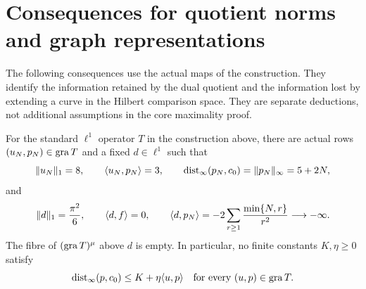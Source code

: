 \section{Consequences for quotient norms and graph representations}
The following consequences use the actual maps of the construction. They
identify the information retained by the dual quotient and the information
lost by extending a curve in the Hilbert comparison space. They are separate deductions,
not additional assumptions in the core maximality proof.

\begin{corollary}\label{cor:corona}
For the standard $\ell^1$ operator $T$ in the construction above, there are
actual rows $(u_N,p_N)\in\operatorname{gra} T$ and a fixed $d\in\ell^1$ such that
\begin{equation}
\|u_N\|_1=8,\qquad \langle u_N,p_N\rangle=3,\qquad
\operatorname{dist}_{\infty}(p_N,c_0)=\|p_N\|_\infty=5+2N,
\label{eq:cor-constant-work}
\end{equation}
and
\begin{equation}
\|d\|_1=\frac{\pi^2}{6},\qquad \langle d,f\rangle=0,\qquad
\langle d,p_N\rangle=-2\sum_{r\ge1}\frac{\min\{N,r\}}{r^2}\longrightarrow-\infty.
\label{eq:cor-fixed-detector}
\end{equation}
The fibre of $(\operatorname{gra} T)^\mu$ above $d$ is empty. In particular, no finite
constants $K,\eta\ge0$ satisfy
\begin{equation}
\operatorname{dist}_{\infty}(p,c_0)\le K+\eta\langle u,p\rangle
\quad\text{for every }(u,p)\in\operatorname{gra} T.
\label{eq:cor-WCC-failure}
\end{equation}
\end{corollary}
